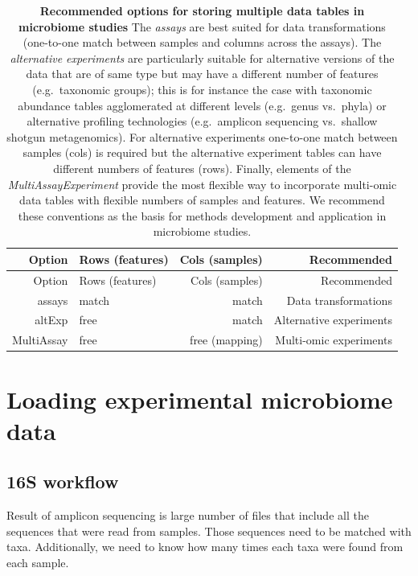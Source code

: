 \documentclass[
]{book}
\begin{document}
\begin{longtable}[]{@{}rlrr@{}}
\caption{\label{tab:options} \textbf{Recommended options for storing multiple data tables in microbiome studies} The \emph{assays} are best suited for data transformations (one-to-one match between samples and columns across the assays). The \emph{alternative experiments} are particularly suitable for alternative versions of the data that are of same type but may have a different number of features (e.g.~taxonomic groups); this is for instance the case with taxonomic abundance tables agglomerated at different levels (e.g.~genus vs.~phyla) or alternative profiling technologies (e.g.~amplicon sequencing vs.~shallow shotgun metagenomics). For alternative experiments one-to-one match between samples (cols) is required but the alternative experiment tables can have different numbers of features (rows). Finally, elements of the \emph{MultiAssayExperiment} provide the most flexible way to incorporate multi-omic data tables with flexible numbers of samples and features. We recommend these conventions as the basis for methods development and application in microbiome studies.}\tabularnewline
\toprule()
Option & Rows (features) & Cols (samples) & Recommended \\
\midrule()
\endfirsthead
\toprule()
Option & Rows (features) & Cols (samples) & Recommended \\
\midrule()
\endhead
assays & match & match & Data transformations \\
altExp & free & match & Alternative experiments \\
MultiAssay & free & free (mapping) & Multi-omic experiments \\
\bottomrule()
\end{longtable}

\hypertarget{loading-experimental-microbiome-data}{%
\section{Loading experimental microbiome data}\label{loading-experimental-microbiome-data}}

\hypertarget{s-workflow}{%
\subsection{16S workflow}\label{s-workflow}}

Result of amplicon sequencing is large number of files that include all the sequences
that were read from samples. Those sequences need to be matched with taxa. Additionally,
we need to know how many times each taxa were found from each sample.
\end{document}
